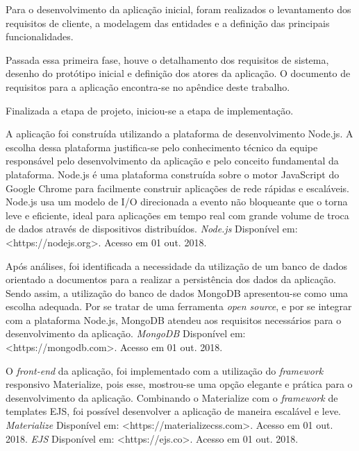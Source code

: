 \par
Para o desenvolvimento da aplicação inicial, foram realizados o levantamento dos requisitos de cliente, a modelagem das entidades e a definição das principais funcionalidades. 

\par
Passada essa primeira fase, houve o detalhamento dos requisitos de sistema, desenho do protótipo inicial e definição dos atores da aplicação.
O documento de requisitos para a aplicação encontra-se no apêndice deste trabalho. 

\par
Finalizada a etapa de projeto, iniciou-se a etapa de implementação. 

A aplicação foi construída utilizando a plataforma de desenvolvimento Node.js. A escolha dessa plataforma justifica-se pelo conhecimento técnico da equipe
responsável pelo desenvolvimento da aplicação e pelo conceito fundamental da plataforma. Node.js é uma plataforma construída sobre o motor JavaScript do 
Google Chrome para facilmente construir aplicações de rede rápidas e escaláveis. Node.js usa um modelo de I/O direcionada a evento não bloqueante que o torna leve e eficiente,
ideal para aplicações em tempo real com grande volume de troca de dados através de dispositivos distribuídos. 
\textit{Node.js} Disponível em: <https://nodejs.org>. Acesso em 01 out. 2018.

\par
Após análises, foi identificada a necessidade da utilização de um banco de dados orientado a documentos para a realizar a persistência dos dados da aplicação. 
Sendo assim, a utilização do banco de dados MongoDB apresentou-se como uma escolha adequada. 
Por se tratar de uma ferramenta \textit{open source}, e por se integrar com a plataforma Node.js, MongoDB atendeu aos requisitos necessários para o desenvolvimento da aplicação.
\textit{MongoDB} Disponível em: <https://mongodb.com>. Acesso em 01 out. 2018.

\par
O \textit{front-end} da aplicação, foi implementado com a utilização do \textit{framework} responsivo Materialize, pois esse, 
mostrou-se uma opção elegante e prática para o desenvolvimento da aplicação. Combinando o Materialize com o \textit{framework} de templates EJS, 
foi possível desenvolver a aplicação de maneira escalável e leve. \textit{Materialize} Disponível em: <https://materializecss.com>. Acesso em 01 out. 2018.
\textit{EJS} Disponível em: <https://ejs.co>. Acesso em 01 out. 2018.

